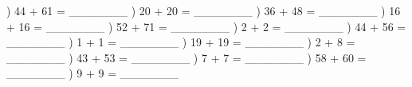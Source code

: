 \documentclass{article}%
\begin{document}
\newline%
) 44 + 61 = \_\_\_\_\_\_\_%
\newline%
\newline%
) 20 + 20 = \_\_\_\_\_\_\_%
\newline%
\newline%
) 36 + 48 = \_\_\_\_\_\_\_%
\newline%
\newline%
) 16 + 16 = \_\_\_\_\_\_\_%
\newline%
\newline%
) 52 + 71 = \_\_\_\_\_\_\_%
\newline%
\newline%
) 2 + 2 = \_\_\_\_\_\_\_%
\newline%
\newline%
) 44 + 56 = \_\_\_\_\_\_\_%
\newline%
\newline%
) 1 + 1 = \_\_\_\_\_\_\_%
\newline%
\newline%
) 19 + 19 = \_\_\_\_\_\_\_%
\newline%
\newline%
) 2 + 8 = \_\_\_\_\_\_\_%
\newline%
\newline%
) 43 + 53 = \_\_\_\_\_\_\_%
\newline%
\newline%
) 7 + 7 = \_\_\_\_\_\_\_%
\newline%
\newline%
) 58 + 60 = \_\_\_\_\_\_\_%
\newline%
\newline%
) 9 + 9 = \_\_\_\_\_\_\_%
\newline%
\newline%
\newline%
\end{document}
